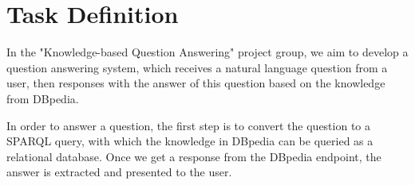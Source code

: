 
\section{Task Definition}

In the "Knowledge-based Question Answering" project group, 
we aim to develop a question answering system, 
which receives a natural language question from a user, 
then responses with the answer of this question based on the knowledge from DBpedia. 

In order to answer a question,
the first step is to convert the question to a SPARQL query,
with which the knowledge in DBpedia can be queried as a relational database. 
Once we get a response from the DBpedia endpoint, 
the answer is extracted and presented to the user. 

